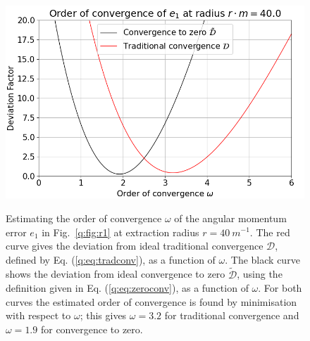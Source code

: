 \begin{figure}[h]
{\includegraphics[width=0.65\columnwidth]{png/conv_order_40_0.png}}
\caption{Estimating the order of convergence $\omega$ of the angular momentum error $e_1$ in Fig.~\ref{q:fig:r1} at extraction radius $r=40 ~m^{-1}$. The red curve gives the deviation from ideal traditional convergence $\mathcal{D}$, defined by Eq. (\ref{q:eq:tradconv}), as a function of $\omega$. The black curve shows the deviation from ideal convergence to zero $\tilde{\mathcal{D}}$, using the definition given in Eq. (\ref{q:eq:zeroconv}), as a function of $\omega$.  For both curves the estimated order of convergence is found by minimisation with respect to $\omega$; this gives $\omega=3.2$ for traditional convergence and $\omega=1.9$ for convergence to zero. }
\label{q:fig:D}
\end{figure}














